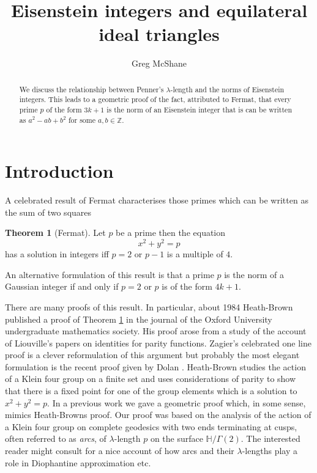 \documentclass[12pt]{amsart}
\title{Eisenstein integers and equilateral ideal triangles}
\author[McShane]{Greg McShane}
\theoremstyle{plain}
\theoremstyle{definition}
\newtheorem{thm}{Theorem}[section]
\def\HH{\mathbb{H}}
\def\xx{\HH/g2}
\def\ZZ{\mathbb{Z}}
\def\g2{\Gamma(2)}
\def\xx{\HH/\g2}
\begin{document}
\maketitle

\begin{abstract} 
We discuss the relationship between Penner's $\lambda$-length
and the norms of Eisenstein integers. This leads to a geometric
proof of the fact, attributed to Fermat, that every prime $p$ of the form $3k + 1$
is the norm of an Eisenstein integer that is can be written
as $a^2 - ab + b^2$ for some $a,b \in \ZZ$.
\end{abstract} 


\section{Introduction}


A celebrated result of Fermat characterises
those primes which can be written as the sum of two squares

\begin{thm}[Fermat]\label{main}
Let $p$ be a prime then the equation
$$x^2 + y^2 = p $$
has a solution in integers  iff  $p =2$ or $p-1$ is a multiple of $4$.
\end{thm}

An alternative formulation of this result is that
a prime $p$ is the norm of a Gaussian integer
if and only if $p =2$ or $p$ is of the form $4k + 1$.

There are many proofs of this result.
In particular, about  1984 Heath-Brown published a proof of Theorem \ref{main} 
  in the journal of the Oxford University undergraduate mathematics society. 
His proof arose from a study of the account of Liouville’s papers on
identities for parity functions. Zagier's celebrated one line proof
\cite{zagier} is a clever reformulation of this argument but
probably the most elegant formulation is the recent proof given by
Dolan \cite{dolan}. Heath-Brown studies the action of a Klein four group  on a finite set and uses considerations of parity to show that there 
is a fixed point for one of the group elements which is a solution 
to $x^2 + y^2 = p$.
In a previous work \cite{vlad} 
we gave a geometric proof which, in some sense,
mimics Heath-Browns proof.
Our proof was based on the analysis of the action of a  Klein four group 
on complete geodesics with two ends terminating at cusps, often referred to as \textit{arcs}, of
$\lambda$-length $p$ on the surface $\xx$.
The interested reader might consult \cite{springborn1, springborn2}
for a nice account of how arcs and their $\lambda$-lengths
play a role in Diophantine approximation etc.
\end{document}
